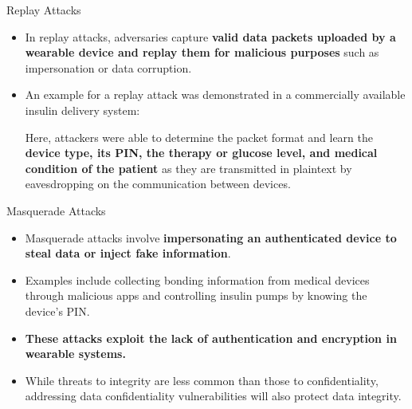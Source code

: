 \documentclass[ucs,9pt]{beamer}
\begin{document}
\begin{frame}{Replay Attacks}
	\begin{itemize}
		\item In replay attacks, adversaries capture \textbf{valid data packets uploaded by a wearable device and replay them for malicious purposes} such as impersonation or data corruption. 
		\item An example for a replay attack was demonstrated in a commercially available insulin delivery system:
		
		Here, attackers were able to determine the packet format and learn the \textbf{device type, its PIN, the therapy or glucose level, and medical condition of the patient} as they are transmitted in plaintext by eavesdropping on the communication between devices.
	\end{itemize}
\end{frame}

\begin{frame}{Masquerade Attacks}
	\begin{itemize}
		\item Masquerade attacks involve \textbf{impersonating an authenticated device to steal data or inject fake information}. 
		\item Examples include collecting bonding information from medical devices through malicious apps and controlling insulin pumps by knowing the device's PIN.
		\item \textbf{These attacks exploit the lack of authentication and encryption in wearable systems.} 
		\item While threats to integrity are less common than those to confidentiality, addressing data confidentiality vulnerabilities will also protect data integrity.
	\end{itemize}
\end{frame}
\end{document}
